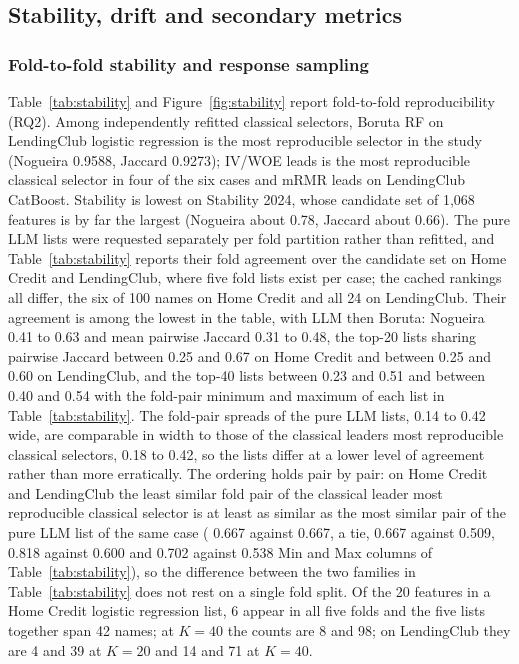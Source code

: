 \documentclass[final,5p,twocolumn]{elsarticle}
\newcommand{\Kfeat}{K}
\providecommand{\DIFaddtex}[1]{{\protect\color{blue} \sf #1}} %
\providecommand{\DIFdeltex}[1]{{\protect\color{red} \scriptsize #1}} %
\providecommand{\DIFaddbegin}{} %
\providecommand{\DIFaddend}{} %
\providecommand{\DIFdelbegin}{} %
\providecommand{\DIFdelend}{} %
\providecommand{\DIFadd}[1]{\texorpdfstring{\DIFaddtex{#1}}{#1}} %
\providecommand{\DIFdel}[1]{\texorpdfstring{\DIFdeltex{#1}}{}} %
\begin{document}
\subsection{\DIFadd{Stability, drift and secondary metrics}}
\label{subsec:stability_drift}

\subsubsection{\DIFadd{Fold-to-fold stability and response sampling}}
\DIFaddend \label{subsec:stability_results}

Table~\ref{tab:stability} and Figure~\ref{fig:stability} report fold-to-fold reproducibility (RQ2). Among independently refitted classical selectors, Boruta RF on LendingClub logistic regression is the most reproducible selector in the study (Nogueira 0.9588, Jaccard 0.9273); IV/WOE \DIFdelbegin \DIFdel{leads }\DIFdelend \DIFaddbegin \DIFadd{is the most reproducible classical selector in }\DIFaddend four of the six cases and mRMR \DIFdelbegin \DIFdel{leads }\DIFdelend \DIFaddbegin \DIFadd{on }\DIFaddend LendingClub CatBoost. Stability is lowest on Stability 2024, whose candidate set of 1,068 features is by far the largest (Nogueira about 0.78, Jaccard about 0.66). The pure LLM lists were requested separately per fold partition rather than refitted, and Table~\ref{tab:stability} reports their fold agreement over the candidate set on Home Credit and LendingClub, where five fold lists exist per case; the cached rankings all differ, the six of 100 names on Home Credit and all 24 on LendingClub. Their agreement is among the lowest in the table, with LLM then Boruta: Nogueira 0.41 to 0.63 and mean pairwise Jaccard 0.31 to 0.48, \DIFdelbegin \DIFdel{the top-20 lists sharing pairwise Jaccard between 0.25 and 0.67 on Home Credit and between 0.25 and 0.60 on LendingClub, and the top-40 lists between 0.23 and 0.51 and between 0.40 and 0.54}\DIFdelend \DIFaddbegin \DIFadd{with the fold-pair minimum and maximum of each list in Table~\ref{tab:stability}}\DIFaddend . The fold-pair spreads of the pure LLM lists, 0.14 to 0.42 wide, are comparable in width to those of the \DIFdelbegin \DIFdel{classical leaders}\DIFdelend \DIFaddbegin \DIFadd{most reproducible classical selectors}\DIFaddend , 0.18 to 0.42, so the lists differ at a lower level of agreement rather than more erratically. The ordering holds pair by pair: on Home Credit and LendingClub the least similar fold pair of the \DIFdelbegin \DIFdel{classical leader }\DIFdelend \DIFaddbegin \DIFadd{most reproducible classical selector }\DIFaddend is at least as similar as the most similar pair of the pure LLM list of the same case (\DIFdelbegin \DIFdel{0.667 against 0.667, a tie, 0.667 against 0.509, 0.818 against 0.600 and 0.702 against 0.538}\DIFdelend \DIFaddbegin \DIFadd{Min and Max columns of Table~\ref{tab:stability}}\DIFaddend ), so the difference between the two families \DIFdelbegin \DIFdel{in Table~\ref{tab:stability} }\DIFdelend does not rest on a single fold split. \DIFdelbegin \DIFdel{Of the 20 features in a Home Credit logistic regression list, 6 appear in all five folds and the five lists together span 42 names; at $\Kfeat=40$ the counts are 8 and 98; on LendingClub they are 4 and 39 at $\Kfeat=20$ and 14 and 71 at $\Kfeat=40$.
}
\end{document}
